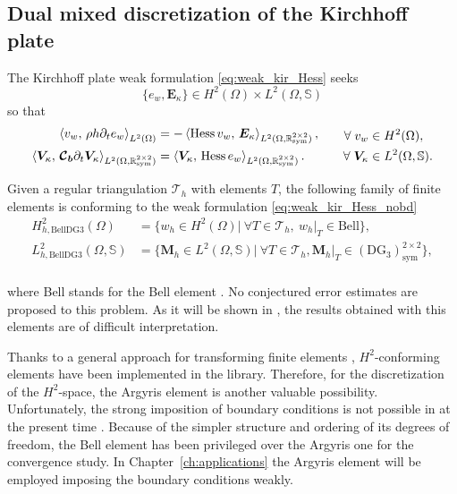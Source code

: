 \subsection{Dual mixed discretization of the Kirchhoff plate}
The Kirchhoff plate weak formulation \eqref{eq:weak_kir_Hess}  seeks
$$\{e_w,\bm{E}_{\kappa}\} \in H^{2}(\Omega) \times L^2(\Omega, \mathbb{S}) $$
so that 
\begin{equation}\label{eq:weak_kir_Hess_nobd}
\begin{aligned}
\inner[L^2(\Omega)]{v_w}{\rho h \partial_t e_w} &= -\inner[L^2(\Omega, \mathbb{R}^{2\times 2}_{\text{sym}})]{\Hess v_w}{\bm{E}_\kappa}, \\
\inner[L^2(\Omega, \mathbb{R}^{2\times 2}_{\text{sym}})]{\bm{V}_\kappa}{\bm{\mathcal{C}_b} \partial_t \bm{V}_\kappa} &= \inner[L^2(\Omega, \mathbb{R}^{2\times 2}_{\text{sym}})]{\bm{V}_\kappa}{\Hess e_w}. \\
\end{aligned} \qquad
\begin{aligned}
\forall \; v_w &\in H^2(\Omega), \\
\forall \; \bm{V}_\kappa &\in L^2(\Omega, \mathbb{S}).
\end{aligned}
\end{equation}


Given a regular triangulation $\mathcal{T}_h$ with elements $T$, the following family of finite elements is conforming to the weak formulation \eqref{eq:weak_kir_Hess_nobd}
\begin{equation}\label{eq:BellDG3}
\begin{aligned}
H_{h, \mathrm{BellDG3}}^{2}(\Omega) &= \{w_h \in H^2(\Omega) \vert \ \forall T \in \mathcal{T}_h, \ w_h|_{T} \in \mathrm{Bell} \}, \\
L_{h, \mathrm{BellDG3}}^2(\Omega, \mathbb{S}) &= \{ \bm{M}_h \in L^2(\Omega, \mathbb{S}) \vert \ \forall T \in \mathcal{T}_h, \bm{M}_h|_{T} \in (\mathrm{DG}_{3})^{2 \times 2}_{\text{sym}} \}, \\
\end{aligned}
\end{equation}

where Bell stands for the Bell element \cite{bell1969}. No conjectured error estimates are proposed to this problem. As it will be shown in , the results obtained with this elements are of difficult interpretation.

\begin{remark}\label{rmk:BellArg}
	Thanks to a general approach for transforming finite elements \cite{kirby2018general}, $H^2$-conforming elements have been implemented in the {} library. 	Therefore, for the discretization of the $H^2$-space, the Argyris element \cite{argyris1968} is another valuable possibility.  Unfortunately, the strong imposition of boundary conditions is not possible in {} at the present time \cite[Sec. 3.2]{kirby2019}. Because of the simpler structure and ordering of its degrees of freedom, the Bell element has been privileged over the Argyris one for the convergence study. In Chapter~\ref{ch:applications} the Argyris element will be employed imposing the boundary conditions weakly.
\end{remark}


